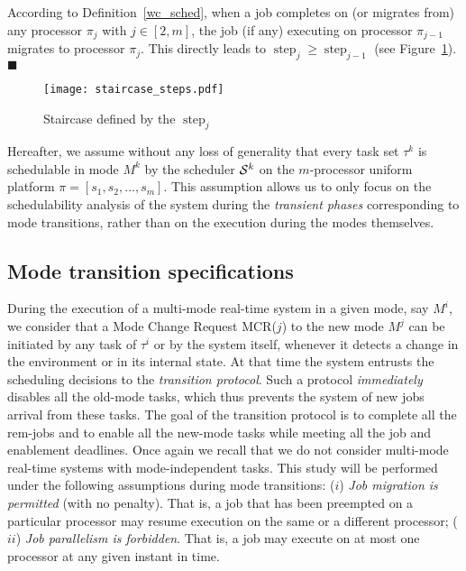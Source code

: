 \documentclass[10pt,english,a4paper]{article}
\newenvironment{proof}[1][Proof]{\begin{trivlist}
\item[\hskip \labelsep {\bfseries #1}]}{\end{trivlist}}
\newtheorem{validity test}{Validity Test}
\newcommand{\minstep}{\operatorname{step}}
\newcommand{\fin}{\hfill{\small $\blacksquare$}}     \newcommand{\oh}[1]{\ensuremath{\mathcal{0}{(#1)}}} \def\thefootnote{\arabic{footnote}}
\begin{document}
\begin{proof}
According to Definition~\ref{wc_sched}, when a job completes on (or migrates from) any processor $\pi_j$ with $j \in \left[ 2, m \right]$, the job (if any) executing on processor $\pi_{j-1}$ migrates to processor $\pi_j$. This directly leads to $\minstep_j \geq \minstep_{j-1}$ (see Figure~\ref{fig:staircase1}). \fin
\end{proof}

\begin{figure}[!h]
\centering
\texttt{[image: staircase\_steps.pdf]}
\caption{Staircase defined by the $\minstep_j$}
\label{fig:staircase1}
\end{figure}

Hereafter, we assume without any loss of generality that every task set $\tau^k$ is schedulable in mode $M^k$ by the scheduler ${\cal S}^k$ on the $m$-processor uniform platform $\pi = [s_1, s_2, \ldots, s_m]$. This assumption allows us to only focus on the schedulability analysis of the system during the {\em transient phases} corresponding to mode transitions, rather than on the execution during the modes themselves. 

\subsection{Mode transition specifications}
\label{sec:modetrans_specs}

During the execution of a multi-mode real-time system in a given mode, say $M^i$, we consider that a Mode Change Request MCR($j$) to the new mode $M^j$ can be initiated by any task of $\tau^i$ or by the system itself, whenever it detects a change in the environment or in its internal state. At that time the system entrusts the scheduling decisions to the {\em transition protocol}. Such a protocol {\em immediately} disables all the old-mode tasks, which thus prevents the system of new jobs arrival from these tasks. The goal of the transition protocol is to complete all the rem-jobs and to enable all the new-mode tasks while meeting all the job and enablement deadlines. Once again we recall that we do not consider multi-mode real-time systems with mode-independent tasks. This study will be performed under the following assumptions during mode transitions: ($i$) {\em Job migration is permitted} (with no penalty). That is, a job that has been preempted on a particular processor may resume execution on the same or a different processor; ($ii$) {\em Job parallelism is forbidden}. That is, a job may execute on at most one processor at any given instant in time.
\end{document}
